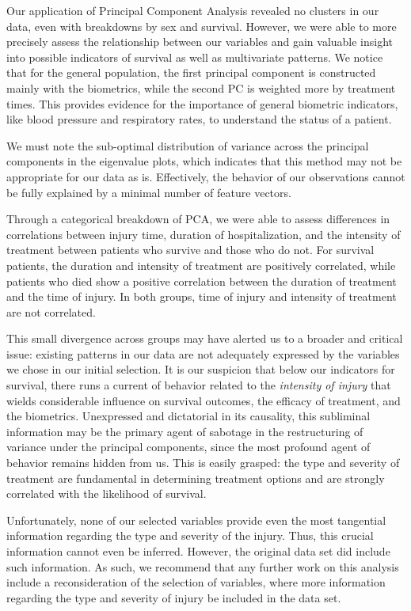 \documentclass[
]{article}
\begin{document}
Our application of Principal Component Analysis revealed no clusters in
our data, even with breakdowns by sex and survival. However, we were
able to more precisely assess the relationship between our variables and
gain valuable insight into possible indicators of survival as well as
multivariate patterns. We notice that for the general population, the
first principal component is constructed mainly with the biometrics,
while the second PC is weighted more by treatment times. This provides
evidence for the importance of general biometric indicators, like blood
pressure and respiratory rates, to understand the status of a patient.

We must note the sub-optimal distribution of variance across the
principal components in the eigenvalue plots, which indicates that this
method may not be appropriate for our data as is. Effectively, the
behavior of our observations cannot be fully explained by a minimal
number of feature vectors.

Through a categorical breakdown of PCA, we were able to assess
differences in correlations between injury time, duration of
hospitalization, and the intensity of treatment between patients who
survive and those who do not. For survival patients, the duration and
intensity of treatment are positively correlated, while patients who
died show a positive correlation between the duration of treatment and
the time of injury. In both groups, time of injury and intensity of
treatment are not correlated.

This small divergence across groups may have alerted us to a broader and
critical issue: existing patterns in our data are not adequately
expressed by the variables we chose in our initial selection. It is our
suspicion that below our indicators for survival, there runs a current
of behavior related to the \emph{intensity of injury} that wields
considerable influence on survival outcomes, the efficacy of treatment,
and the biometrics. Unexpressed and dictatorial in its causality, this
subliminal information may be the primary agent of sabotage in the
restructuring of variance under the principal components, since the most
profound agent of behavior remains hidden from us. This is easily
grasped: the type and severity of treatment are fundamental in
determining treatment options and are strongly correlated with the
likelihood of survival.

Unfortunately, none of our selected variables provide even the most
tangential information regarding the type and severity of the injury.
Thus, this crucial information cannot even be inferred. However, the
original data set did include such information. As such, we recommend
that any further work on this analysis include a reconsideration of the
selection of variables, where more information regarding the type and
severity of injury be included in the data set.
\end{document}
